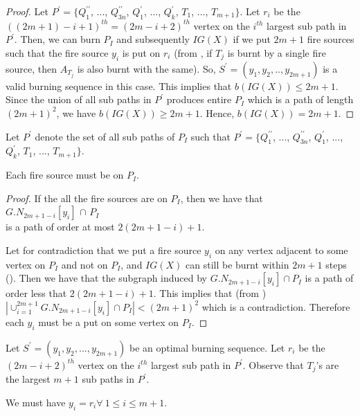 \begin{proof}
Let 
$P^\prime = \{Q^{\prime\prime}_1$, $...$, $Q^{\prime\prime}_{3n}$, $Q^\prime_1$, $...$, $Q^\prime_k$, $T_1$, $...$, $T_{m+1}\}$. Let $r_i$ be the $((2m+1)-i+1)^{th} = (2m-i+2)^{th}$ vertex on the $i^{th}$ largest sub path in $P^\prime$. Then, we can burn $P_I$ and subsequently $IG(X)$ if we put $2m+1$ fire sources such that the fire source $y_i$ is put on $r_i$ (from , if $T_j$ is burnt by a single fire source, then $A_{T_j}$ is also burnt with the same). So, $S^\prime = (y_1,y_2,..,y_{2m+1})$ is a valid burning sequence in this case. This implies that $b(IG(X))\leq 2m+1$. Since the union of all sub paths in $P^\prime$ produces entire $P_I$ which is a path of length $(2m+1)^2$, we have $b(IG(X))\geq 2m+1$. Hence, $b(IG(X)) = 2m+1$.
\end{proof}

Let $P^\prime$ denote the set of all sub paths of $P_I$ such that $P^\prime = \{Q^{\prime\prime}_1$, $...$, $Q^{\prime\prime}_{3n}$, $Q^\prime_1$, $...$, $Q^\prime_k$, $T_1$, $...$, $T_{m+1}\}$.

\begin{lemma}\label{lemma:EFSOnPath}
Each fire source must be on $P_I$.
\end{lemma}

\begin{proof}
If the all the fire sources are on $P_I$, then we have that\\ $G.N_{2m+1-i}[y_i]$ $\cap$ $P_I$\\
is a path of order at most $2(2m+1-i)+1$.

Let for contradiction that we put a fire source $y_i$ on any vertex adjacent to some vertex on $P_I$ and not on $P_I$, and $IG(X)$ can still be burnt within $2m+1$ steps (). Then we have that the subgraph induced by $G.N_{2m+1-i}[y_i]\cap P_I$ is a path of order less that $2(2m+1-i)+1$. This implies that (from ) $|\cup_{i=1}^{2m+1}G.N_{2m+1-i}[y_i]\cap P_I|<(2m+1)^2$ which is a contradiction. Therefore each $y_i$ must be a put on some vertex on $P_I$.
\end{proof}

Let $S^\prime=(y_1,y_2,...,y_{2m+1})$ be an optimal burning sequence. Let $r_i$ be the $(2m-i+2)^{th}$ vertex on the $i^{th}$ largest sub path in $P^\prime$.
Observe that $T_j$'s are the largest $m+1$ sub paths in $P^\prime$.

\begin{lemma}\label{lemma:AFSOnr_iIG}
We must have $y_i=r_i \forall\ 1\leq i\leq m+1$.
\end{lemma}

